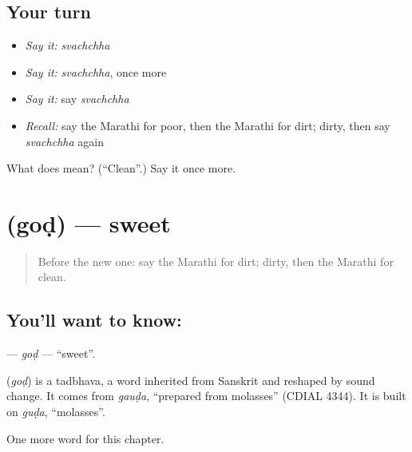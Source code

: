 \subsection*{Your turn}
\begin{itemize}
\raggedright
  \item \emph{Say it:} \emph{svachchha}
  \item \emph{Say it:} \emph{svachchha}, once more
  \item \emph{Say it:} say \emph{svachchha}
  \item \emph{Recall:} say the Marathi for poor, then the Marathi for dirt; dirty, then say \emph{svachchha} again
\end{itemize}

\begin{tcolorbox}[breakable,colback=teal!4,colframe=teal!35!black,title={Before you move on}]
What does  mean? (\textquotedblleft{}Clean\textquotedblright{}.) Say it once more.
\end{tcolorbox}
\section[\texorpdfstring{\mr{गोड} (goḍ)}{गोड (goḍ)}]{ (goḍ) — sweet}

\label{lesson:MR-C106-god}



\begin{quote}
Before the new one: say the Marathi for dirt; dirty, then the Marathi for clean.
\end{quote}

\subsection*{You'll want to know: }
\textbf{} — \emph{goḍ} — \textquotedblleft{}sweet\textquotedblright{}.

\begin{cousinweb}
\textbf{} (\emph{goḍ}) is a tadbhava, a word inherited from Sanskrit and reshaped by sound change. It comes from \emph{gauḍa}, \textquotedblleft{}prepared from molasses\textquotedblright{} (CDIAL 4344). It is built on \emph{guḍa}, \textquotedblleft{}molasses\textquotedblright{}.
\end{cousinweb}

\begin{grammarlens}[title={What you've built}]
One more word for this chapter.
\end{grammarlens}

